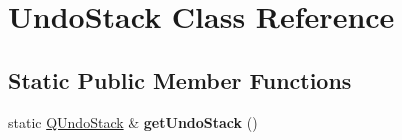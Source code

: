 \hypertarget{classUndo__Redo_1_1UndoStack}{}\section{Undo\+Stack Class Reference}
\label{classUndo__Redo_1_1UndoStack}
\subsection*{Static Public Member Functions}
\begin{DoxyCompactItemize}
\item 
\hypertarget{classUndo__Redo_1_1UndoStack_a89724e3c86a4dc5d51198d844d464d47}{}static \hyperlink{classUndo__Redo_1_1QUndoStack}{Q\+Undo\+Stack} \& {\bfseries get\+Undo\+Stack} ()\label{classUndo__Redo_1_1UndoStack_a89724e3c86a4dc5d51198d844d464d47}

\end{DoxyCompactItemize}
